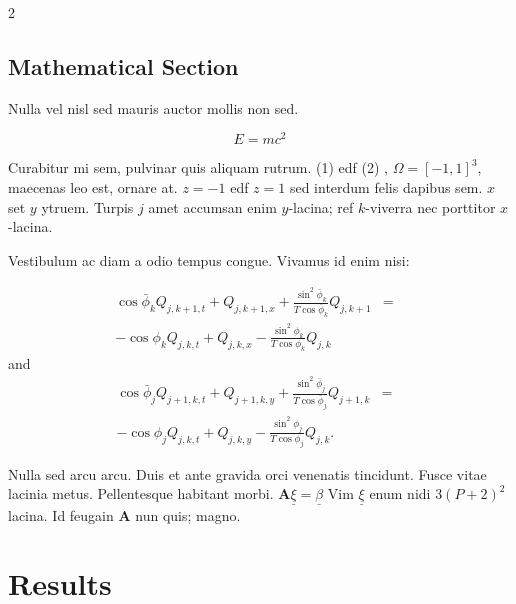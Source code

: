 \documentclass[a0,portrait]{a0poster}
\begin{document}
\begin{multicols}{2}
\subsection*{Mathematical Section}

Nulla vel nisl sed mauris auctor mollis non sed. 

\begin{equation}
E = mc^{2}
\label{eqn:Einstein}
\end{equation}

Curabitur mi sem, pulvinar quis aliquam rutrum. (1) edf (2)
, $\Omega=[-1,1]^3$, maecenas leo est, ornare at. $z=-1$ edf $z=1$ sed interdum felis dapibus sem. $x$ set $y$ ytruem. 
Turpis $j$ amet accumsan enim $y$-lacina; 
ref $k$-viverra nec porttitor $x$-lacina. 

Vestibulum ac diam a odio tempus congue. Vivamus id enim nisi:

\begin{eqnarray}
\cos\bar{\phi}_k Q_{j,k+1,t} + Q_{j,k+1,x}+\frac{\sin^2\bar{\phi}_k}{T\cos\bar{\phi}_k} Q_{j,k+1} &=&\nonumber\\ 
-\cos\phi_k Q_{j,k,t} + Q_{j,k,x}-\frac{\sin^2\phi_k}{T\cos\phi_k} Q_{j,k}\label{edgek}
\end{eqnarray}
and
\begin{eqnarray}
\cos\bar{\phi}_j Q_{j+1,k,t} + Q_{j+1,k,y}+\frac{\sin^2\bar{\phi}_j}{T\cos\bar{\phi}_j} Q_{j+1,k}&=&\nonumber \\
-\cos\phi_j Q_{j,k,t} + Q_{j,k,y}-\frac{\sin^2\phi_j}{T\cos\phi_j} Q_{j,k}.\label{edgej}
\end{eqnarray} 

Nulla sed arcu arcu. Duis et ante gravida orci venenatis tincidunt. Fusce vitae lacinia metus. Pellentesque habitant morbi. $\mathbf{A}\underline{\xi}=\underline{\beta}$ Vim $\underline{\xi}$ enum nidi $3(P+2)^{2}$ lacina. Id feugain $\mathbf{A}$ nun quis; magno.


\section*{Results}


\end{multicols}
\end{document}
